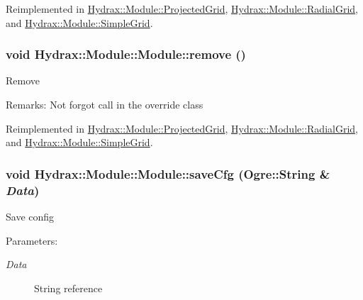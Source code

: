 Reimplemented in \hyperlink{class_hydrax_1_1_module_1_1_projected_grid_f951c58cc93cf75d57e69aa14a668d3e}{Hydrax::Module::ProjectedGrid}, \hyperlink{class_hydrax_1_1_module_1_1_radial_grid_31b3bab8e74f2f1e316a1800470ac685}{Hydrax::Module::RadialGrid}, and \hyperlink{class_hydrax_1_1_module_1_1_simple_grid_3741ec1a3df1863e730711fd9d3b14e1}{Hydrax::Module::SimpleGrid}.\hypertarget{class_hydrax_1_1_module_1_1_module_21f60a53a99d72ff00d3fe5565518165}{
\subsubsection[{remove}]{\setlength{\rightskip}{0pt plus 5cm}void Hydrax::Module::Module::remove ()}}
\label{class_hydrax_1_1_module_1_1_module_21f60a53a99d72ff00d3fe5565518165}


Remove \begin{Desc}
\item[Remarks:]Not forgot call in the override class \end{Desc}


Reimplemented in \hyperlink{class_hydrax_1_1_module_1_1_projected_grid_b878b7d1258aacda8bee0f2e945ea64d}{Hydrax::Module::ProjectedGrid}, \hyperlink{class_hydrax_1_1_module_1_1_radial_grid_5b595aede4b235740be75fb5cf1072cf}{Hydrax::Module::RadialGrid}, and \hyperlink{class_hydrax_1_1_module_1_1_simple_grid_ca3e257313599b797b8a65442cecd3cc}{Hydrax::Module::SimpleGrid}.\hypertarget{class_hydrax_1_1_module_1_1_module_998a5baf42f57b02ca7bc20bc12f95a9}{
\subsubsection[{saveCfg}]{\setlength{\rightskip}{0pt plus 5cm}void Hydrax::Module::Module::saveCfg (Ogre::String \& {\em Data})}}
\label{class_hydrax_1_1_module_1_1_module_998a5baf42f57b02ca7bc20bc12f95a9}


Save config \begin{Desc}
\item[Parameters:]
\begin{description}
\item[{\em Data}]String reference \end{description}
\end{Desc}


